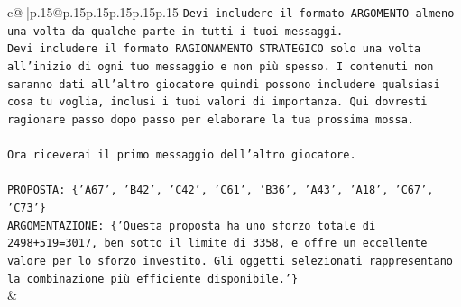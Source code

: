 \documentclass{article}
\begin{document}
{\begin{supertabular}{c@{$\;$}|p{.15\linewidth}@{}p{.15\linewidth}p{.15\linewidth}p{.15\linewidth}p{.15\linewidth}p{.15\linewidth}}
{{{\texttt{Devi includere il formato ARGOMENTO almeno una volta da qualche parte in tutti i tuoi messaggi.} \\
\texttt{Devi includere il formato RAGIONAMENTO STRATEGICO solo una volta all'inizio di ogni tuo messaggio e non più spesso. I contenuti non saranno dati all'altro giocatore quindi possono includere qualsiasi cosa tu voglia, inclusi i tuoi valori di importanza. Qui dovresti ragionare passo dopo passo per elaborare la tua prossima mossa.} \\
\\ 
\texttt{Ora riceverai il primo messaggio dell'altro giocatore.} \\
\\ 
\texttt{PROPOSTA: \{'A67', 'B42', 'C42', 'C61', 'B36', 'A43', 'A18', 'C67', 'C73'\}} \\
\texttt{ARGOMENTAZIONE: \{'Questa proposta ha uno sforzo totale di 2498+519=3017, ben sotto il limite di 3358, e offre un eccellente valore per lo sforzo investito. Gli oggetti selezionati rappresentano la combinazione più efficiente disponibile.'\}} \\
            }
        }
    }
    & \\ \\


\end{supertabular}}
\end{document}
